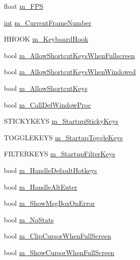 \begin{DoxyCompactItemize}
float \hyperlink{struct_d_x_u_t_state_1_1_s_t_a_t_e_abc7637b0968147d988ae1b0b5412f6cc}{m\_\-FPS}
\item 
\hyperlink{_d_x_u_tgui_8cpp_a2d77ed03302b6978834ee3b6f57837fb}{int} \hyperlink{struct_d_x_u_t_state_1_1_s_t_a_t_e_afcc6c23946a4055750772a78f92f9550}{m\_\-CurrentFrameNumber}
\item 
HHOOK \hyperlink{struct_d_x_u_t_state_1_1_s_t_a_t_e_ae77d30129b56d705a0b926181cfa1669}{m\_\-KeyboardHook}
\item 
bool \hyperlink{struct_d_x_u_t_state_1_1_s_t_a_t_e_ae9bf869e6bde0ba638b5385fa64f73c3}{m\_\-AllowShortcutKeysWhenFullscreen}
\item 
bool \hyperlink{struct_d_x_u_t_state_1_1_s_t_a_t_e_a66398b1940d823c10e541198ab7bb60c}{m\_\-AllowShortcutKeysWhenWindowed}
\item 
bool \hyperlink{struct_d_x_u_t_state_1_1_s_t_a_t_e_a1993cb637d5f32d905968688169da93f}{m\_\-AllowShortcutKeys}
\item 
bool \hyperlink{struct_d_x_u_t_state_1_1_s_t_a_t_e_a1c6fea5f6353b2dfd213a97a42bca656}{m\_\-CallDefWindowProc}
\item 
STICKYKEYS \hyperlink{struct_d_x_u_t_state_1_1_s_t_a_t_e_a30b3832b5a89efc32da4e0933bad1586}{m\_\-StartupStickyKeys}
\item 
TOGGLEKEYS \hyperlink{struct_d_x_u_t_state_1_1_s_t_a_t_e_acb7e05dbf1052304b48f2fcf621de46c}{m\_\-StartupToggleKeys}
\item 
FILTERKEYS \hyperlink{struct_d_x_u_t_state_1_1_s_t_a_t_e_a4ed4b6485e57b04eb5b6f8ff1ae42640}{m\_\-StartupFilterKeys}
\item 
bool \hyperlink{struct_d_x_u_t_state_1_1_s_t_a_t_e_a149bf250d92ac84d85028c52966c4aea}{m\_\-HandleDefaultHotkeys}
\item 
bool \hyperlink{struct_d_x_u_t_state_1_1_s_t_a_t_e_a7f10d208e530856c56700a4294dd0e0a}{m\_\-HandleAltEnter}
\item 
bool \hyperlink{struct_d_x_u_t_state_1_1_s_t_a_t_e_a004e30340dddb4fa02e7b543aeffefa2}{m\_\-ShowMsgBoxOnError}
\item 
bool \hyperlink{struct_d_x_u_t_state_1_1_s_t_a_t_e_a1dc5fdc02f30f7b855ab658efa8ef766}{m\_\-NoStats}
\item 
bool \hyperlink{struct_d_x_u_t_state_1_1_s_t_a_t_e_a2e774e7182004e2dc8886b4eda221667}{m\_\-ClipCursorWhenFullScreen}
\item 
bool \hyperlink{struct_d_x_u_t_state_1_1_s_t_a_t_e_ab2e16be5d482a6e743ec3a82dea880fb}{m\_\-ShowCursorWhenFullScreen}
\item 

\end{DoxyCompactItemize}

